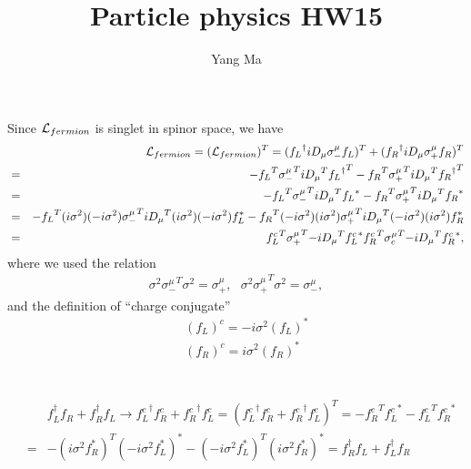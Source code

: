 \documentclass[11pt]{article}
\begin{document}
\title{Particle physics HW15}
\author{Yang Ma}

\maketitle

\section{ }
Since ${\cal L}_{fermion}$ is singlet in spinor space, we have
\begin{eqnarray}
    &&{\cal L}_{fermion}= ( {\cal L}_{fermion} )^T
    =   ( {f_L}^\dagger iD_\mu \sigma_-^\mu {f_L} )^T
      + ( {f_R}^\dagger iD_\mu \sigma_+^\mu {f_R} )^T \nonumber \\
    &=& - {f_L}^T {\sigma_-^\mu}^T  {iD_\mu}^T {{f_L}^\dagger}^T
      - {f_R}^T {\sigma_+^\mu}^T  {iD_\mu}^T {{f_R}^\dagger}^T \nonumber \\
    &=& - {f_L}^T {\sigma_-^\mu}^T  {iD_\mu}^T  {f_L}^*
      - {f_R}^T {\sigma_+^\mu}^T  {iD_\mu}^T  {f_R}^* \nonumber \\
    &=& - {f_L}^T (i\sigma^2)(-i\sigma^2) {\sigma_-^\mu}^T  {iD_\mu}^T (i\sigma^2) (-i\sigma^2) f_L^*
      - {f_R}^T (-i\sigma^2)(i\sigma^2) {\sigma_+^\mu}^T  {iD_\mu}^T  (-i\sigma^2)(i\sigma^2)f_R^*  \nonumber \\
      &=& {f_L^c}^T {\sigma_+^\mu}^T  {-iD_\mu}^T  {f_L^c}^*
       {f_R^c}^T {\sigma_c^\mu}^T  {-iD_\mu}^T  {f_R^c}^* ,
\end{eqnarray}
where we used the relation
\begin{eqnarray}
    \sigma^2 {\sigma_-^\mu}^T\sigma^2=\sigma_+^\mu,~~~
    \sigma^2 {\sigma_+^\mu}^T\sigma^2=\sigma_-^\mu,
\end{eqnarray}
 and the definition of ``charge conjugate''
 \begin{eqnarray}
    && (f_L)^c = -i\sigma^2 (f_L)^* \\
    && (f_R)^c =  i\sigma^2 (f_R)^*
  \end{eqnarray}

\section{ }
\begin{eqnarray}
   &&f_L^\dagger f_R      + f_R^\dagger f_L
   \to  {f_L^c}^\dagger f_R^c + {f_R^c}^\dagger f_L^c 
   = ( {f_L^c}^\dagger f_R^c + {f_R^c}^\dagger f_L^c )^T 
   = - {f_R^c}^T {f_L^c}^*  - {f_L^c}^T {f_R^c}^*  \nonumber \\
   &=& - (i\sigma^2 f_R^*)^T (-i\sigma^2 f_L^*)^*  - (-i\sigma^2 f_L^*)^T (i\sigma^2 f_R^*)^* 
   =   f_R^\dagger f_L + f_L^\dagger f_R
\end{eqnarray}
\end{document}
